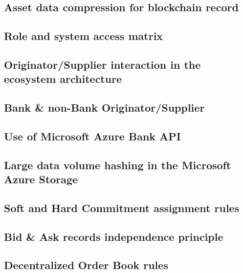 \documentclass{article}
\begin{document}
\begin{multicols}{2}
\subsection{Asset data compression for blockchain record}

\text{ }

\subsection{Role and system access matrix}

\text{ }

\subsection{Originator/Supplier interaction in the ecosystem architecture}

\text{ }

\subsection{Bank \& non-Bank Originator/Supplier}

\text{ }

\subsection{Use of Microsoft Azure Bank API}

\text{ }

\subsection{Large data volume hashing in the Microsoft Azure Storage}

\text{ }

\subsection{Soft and Hard Commitment assignment rules}

\text{ }

\subsection{Bid \& Ask records independence principle}

\text{ }

\subsection{Decentralized Order Book rules}


\end{multicols}
\end{document}
